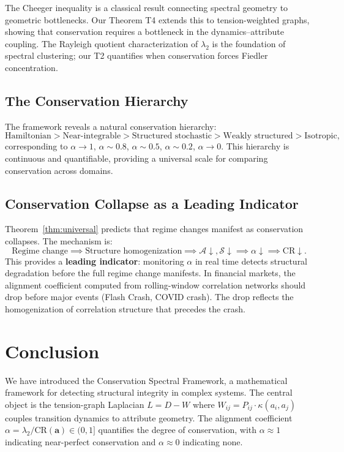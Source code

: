 \documentclass[12pt,letterpaper]{article}
\newcommand{\bfa}{\mathbf{a}}
\newcommand{\CR}{\mathrm{CR}}
\newcommand{\cA}{\mathcal{A}}
\newcommand{\cS}{\mathcal{S}}
\begin{document}
The Cheeger inequality \citep{cheeger1970} is a classical result connecting spectral geometry to geometric bottlenecks. Our Theorem T4 extends this to tension-weighted graphs, showing that conservation requires a bottleneck in the dynamics--attribute coupling. The Rayleigh quotient characterization of $\lambda_2$ \citep{fiedler1973} is the foundation of spectral clustering; our T2 quantifies when conservation forces Fiedler concentration.

\subsection{The Conservation Hierarchy}

The framework reveals a natural conservation hierarchy:
\[
  \text{Hamiltonian} > \text{Near-integrable} > \text{Structured stochastic} > \text{Weakly structured} > \text{Isotropic},
\]
corresponding to $\alpha \to 1$, $\alpha \sim 0.8$, $\alpha \sim 0.5$, $\alpha \sim 0.2$, $\alpha \to 0$. This hierarchy is continuous and quantifiable, providing a universal scale for comparing conservation across domains.

\subsection{Conservation Collapse as a Leading Indicator}

Theorem~\ref{thm:universal} predicts that regime changes manifest as conservation collapses. The mechanism is:
\[
  \text{Regime change} \implies \text{Structure homogenization} \implies \cA \downarrow, \cS \downarrow \implies \alpha \downarrow \implies \CR \downarrow.
\]
This provides a \textbf{leading indicator}: monitoring $\alpha$ in real time detects structural degradation before the full regime change manifests. In financial markets, the alignment coefficient computed from rolling-window correlation networks should drop before major events (Flash Crash, COVID crash). The drop reflects the homogenization of correlation structure that precedes the crash.

\section{Conclusion}
\label{sec:conclusion}

We have introduced the Conservation Spectral Framework, a mathematical framework for detecting structural integrity in complex systems. The central object is the tension-graph Laplacian $L = D - W$ where $W_{ij} = P_{ij} \cdot \kappa(a_i, a_j)$ couples transition dynamics to attribute geometry. The alignment coefficient $\alpha = \lambda_2/\CR(\bfa) \in (0, 1]$ quantifies the degree of conservation, with $\alpha \approx 1$ indicating near-perfect conservation and $\alpha \approx 0$ indicating none.
\end{document}
